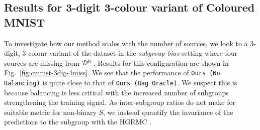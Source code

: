 
%
\subsection{Results for 3-digit 3-colour variant of Coloured MNIST}\label{ssec:3-digit-3-color}
%
To investigate how our method scales with the number of sources, we look to a 3-digit, 3-colour
variant of the dataset in the \emph{subgroup bias} setting where four sources are missing from
${\mathcal{D}}^{tr}$.
Results for this configuration are shown in Fig.~\ref{fig:cmnist-3dig-4miss}. We see that the
performance of \texttt{Ours (No Balancing)} is quite close to that of \texttt{Ours (Bag Oracle)}.
We suspect this is because balancing is less critical with the increased number of subgroups
strengthening the training signal. As inter-subgroup ratios do not make for suitable metric for
non-binary $S$, we instead quantify the invariance of the predictions to the subgroup with the
\ac{HGRMC} \citep{renyi1959measures}.

